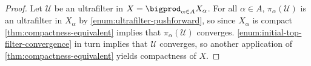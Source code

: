 \documentclass[article, a4paper, 11pt, oneside]{memoir}
\numberwithin{equation}{chapter}
\newcommand{\calU}{\mathcal{U}}
\theoremstyle{nonumberplain}
\begin{document}
\begin{proof}
    Let $\calU$ be an ultrafilter in $X = \bigprod_{\alpha \in A} X_\alpha$. For all $\alpha \in A$, $\pi_\alpha(\calU)$ is an ultrafilter in $X_\alpha$ by \cref{enum:ultrafilter-pushforward}, so since $X_\alpha$ is compact \cref{thm:compactness-equivalent} implies that $\pi_\alpha(\calU)$ converges. \cref{enum:initial-top-filter-convergence} in turn implies that $\calU$ converges, so another application of \cref{thm:compactness-equivalent} yields compactness of $X$.
\end{proof}


\nocite{*}

\printbibliography
\end{document}
